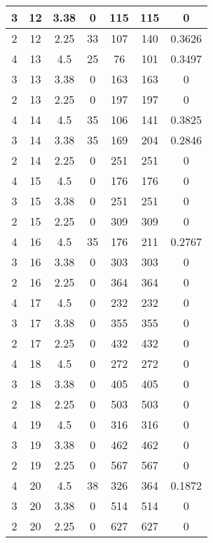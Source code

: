 \documentclass[letterpaper, 12pt]{article}
\begin{document}
\begin{longtable}{|c|c|c|c|c|c|c|}
\hline
3 & 12 & 3.38 & 0 & 115 & 115 & 0 \\
\hline
2 & 12 & 2.25 & 33 & 107 & 140 & 0.3626 \\
\hline
4 & 13 & 4.5 & 25 & 76 & 101 & 0.3497 \\
\hline
3 & 13 & 3.38 & 0 & 163 & 163 & 0 \\
\hline
2 & 13 & 2.25 & 0 & 197 & 197 & 0 \\
\hline
4 & 14 & 4.5 & 35 & 106 & 141 & 0.3825 \\
\hline
3 & 14 & 3.38 & 35 & 169 & 204 & 0.2846 \\
\hline
2 & 14 & 2.25 & 0 & 251 & 251 & 0 \\
\hline
4 & 15 & 4.5 & 0 & 176 & 176 & 0 \\
\hline
3 & 15 & 3.38 & 0 & 251 & 251 & 0 \\
\hline
2 & 15 & 2.25 & 0 & 309 & 309 & 0 \\
\hline
4 & 16 & 4.5 & 35 & 176 & 211 & 0.2767 \\
\hline
3 & 16 & 3.38 & 0 & 303 & 303 & 0 \\
\hline
2 & 16 & 2.25 & 0 & 364 & 364 & 0 \\
\hline
4 & 17 & 4.5 & 0 & 232 & 232 & 0 \\
\hline
3 & 17 & 3.38 & 0 & 355 & 355 & 0 \\
\hline
2 & 17 & 2.25 & 0 & 432 & 432 & 0 \\
\hline
4 & 18 & 4.5 & 0 & 272 & 272 & 0 \\
\hline
3 & 18 & 3.38 & 0 & 405 & 405 & 0 \\
\hline
2 & 18 & 2.25 & 0 & 503 & 503 & 0 \\
\hline
4 & 19 & 4.5 & 0 & 316 & 316 & 0 \\
\hline
3 & 19 & 3.38 & 0 & 462 & 462 & 0 \\
\hline
2 & 19 & 2.25 & 0 & 567 & 567 & 0 \\
\hline
4 & 20 & 4.5 & 38 & 326 & 364 & 0.1872 \\
\hline
3 & 20 & 3.38 & 0 & 514 & 514 & 0 \\
\hline
2 & 20 & 2.25 & 0 & 627 & 627 & 0 \\
\hline
\end{longtable}
\end{document}
